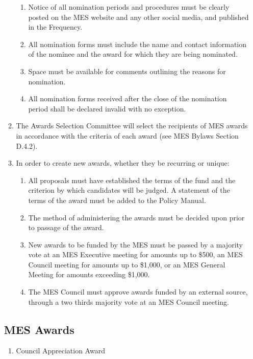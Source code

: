 \begin{enumerate}
\begin{enumerate}
  \begin{enumerate}
   \item
    Notice of all nomination periods and procedures must be clearly
    posted on the MES website and any other social media, and published
    in the Frequency.
   \item
    All nomination forms must include the name and contact information
    of the nominee and the award for which they are being nominated.
   \item
    Space must be available for comments outlining the reasons for
    nomination.
   \item
    All nomination forms received after the close of the nomination
    period shall be declared invalid with no exception.
  \end{enumerate}
 \item
  The Awards Selection Committee will select the recipients of MES
  awards in accordance with the criteria of each award (see MES Bylaws
  Section D.4.2).
 \item
  In order to create new awards, whether they be recurring or unique:

  \begin{enumerate}
   \item
    All proposals must have established the terms of the fund and the
    criterion by which candidates will be judged. A statement of the
    terms of the award must be added to the Policy Manual.
   \item
    The method of administering the awards must be decided upon prior to
    passage of the award.
   \item
    New awards to be funded by the MES must be passed by a majority vote
    at an MES Executive meeting for amounts up to \$500, an MES Council
    meeting for amounts up to \$1,000, or an MES General Meeting for
    amounts exceeding \$1,000.
   \item
    The MES Council must approve awards funded by an external source,
    through a two thirds majority vote at an MES Council meeting.
  \end{enumerate}
\end{enumerate}

\hypertarget{mes-awards}{%
 \subsection{MES Awards}
 \label{mes-awards}}
\begin{enumerate}
 \item
  Council Appreciation Award


\end{enumerate}
\end{enumerate}
